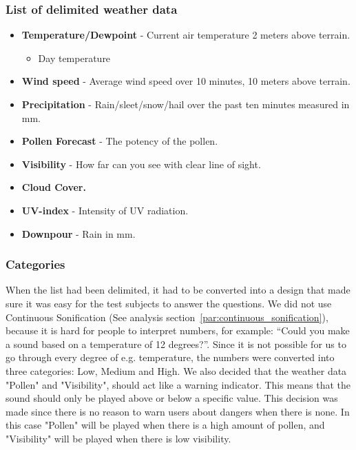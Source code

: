 

\subsubsection*{List of delimited weather data} %
\label{ssub:list_of_delimited_weather_data}

\begin{itemize}
     \item \textbf{Temperature/Dewpoint} - Current air temperature 2 meters above terrain.
     \begin{itemize}
         \item Day temperature
     \end{itemize}
     \item \textbf{Wind speed} - Average wind speed over 10 minutes, 10 meters above terrain.
     \item \textbf{Precipitation} - Rain/sleet/snow/hail over the past ten minutes measured in mm.
     \item \textbf{Pollen Forecast} - The potency of the pollen.
     \item \textbf{Visibility} - How far can you see with clear line of sight.
     \item \textbf{Cloud Cover.}
     \item \textbf{UV-index} - Intensity of UV radiation.
     \item \textbf{Downpour} - Rain in mm.
 \end{itemize}



\subsubsection{Categories} %
\label{ssub:categories}

When the list had been delimited, it had to be converted into a design that made sure it was easy for the test subjects to answer the questions. 
We did not use Continuous Sonification (See analysis section~\ref{par:continuous_sonification}), because it is hard for people to interpret numbers, for example: \enquote{Could you make a sound based on a temperature of 12 degrees?}. 
Since it is not possible for us to go through every degree of e.g. temperature, the numbers were converted into three categories: Low, Medium and High. 
We also decided that the weather data "Pollen" and "Visibility", should act like a warning indicator. 
This means that the sound should only be played above or below a specific value.
This decision was made since there is no reason to warn users about dangers when there is none. 
In this case "Pollen" will be played when there is a high amount of pollen, and "Visibility" will be played when there is low visibility.

